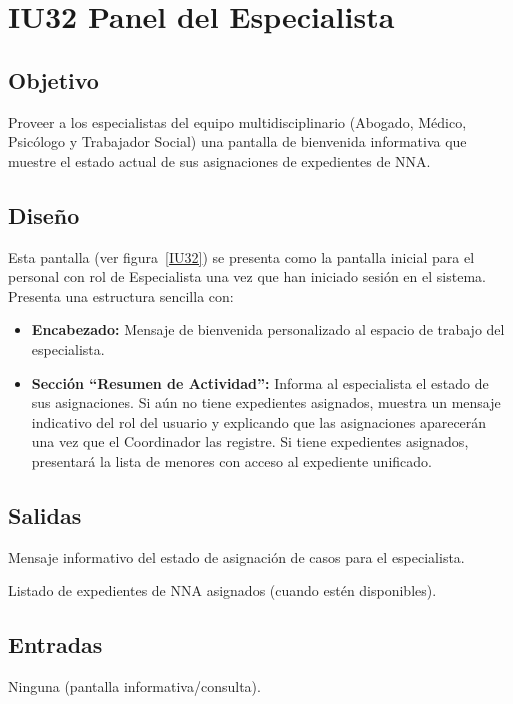 \section{IU32 Panel del Especialista}

\subsection{Objetivo}
	Proveer a los especialistas del equipo multidisciplinario (Abogado, Médico, Psicólogo y Trabajador Social) una pantalla de bienvenida informativa que muestre el estado actual de sus asignaciones de expedientes de NNA.

\subsection{Diseño}
	Esta pantalla  (ver figura~\ref{IU32}) se presenta como la pantalla inicial para el personal con rol de Especialista una vez que han iniciado sesión en el sistema. Presenta una estructura sencilla con:
	\begin{itemize}
		\item \textbf{Encabezado:} Mensaje de bienvenida personalizado al espacio de trabajo del especialista.
		\item \textbf{Sección ``Resumen de Actividad'':} Informa al especialista el estado de sus asignaciones. Si aún no tiene expedientes asignados, muestra un mensaje indicativo del rol del usuario y explicando que las asignaciones aparecerán una vez que el Coordinador las registre. Si tiene expedientes asignados, presentará la lista de menores con acceso al expediente unificado.
	\end{itemize}


\subsection{Salidas}
	\begin{Citemize}
		\item Mensaje informativo del estado de asignación de casos para el especialista.
		\item Listado de expedientes de NNA asignados (cuando estén disponibles).
	\end{Citemize}

\subsection{Entradas}
	Ninguna (pantalla informativa/consulta).

